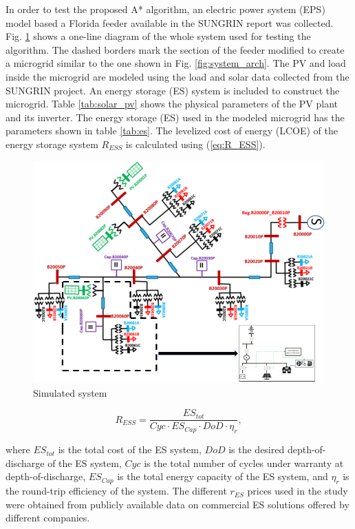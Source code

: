 In order to test the proposed A* algorithm, an electric power system (EPS) model based a Florida feeder available in the SUNGRIN report \cite{SUNGRIN} was collected. Fig. \ref{fig:simulation_grid} shows a one-line diagram of the whole system used for testing the algorithm. The dashed borders mark the section of the feeder modified to create a microgrid similar to the one shown in Fig. \ref{fig:system_arch}. The PV and load inside the microgrid are modeled using the load and solar data collected from the SUNGRIN project. An energy storage (ES) system is included to construct the microgrid. Table \ref{tab:solar_pv} shows the physical parameters of the PV plant and its inverter. The energy storage (ES) used in the modeled microgrid has the parameters shown in table \ref{tab:es}. The levelized cost of energy (LCOE)  of the energy storage system $R_{ESS}$ is calculated using (\ref{eq:R_ESS}).

\begin{figure}[!ht]
    \centering
    \includegraphics[width = \linewidth]{figs/simulation_grid.png}
    \caption{Simulated system}
    \label{fig:simulation_grid}
\end{figure}


\begin{equation}
\label{eq:R_ESS}
R_{ESS} = \dfrac{ES_{tot}}{Cyc\cdot ES_{Cap}\cdot DoD\cdot \eta_{r}},
\end{equation}

where $ES_{tot}$ is the total cost of the ES system, $DoD$ is the desired depth-of-discharge of the ES system, $Cyc$ is the total number of cycles under warranty at depth-of-discharge, $ES_{Cap}$ is the total energy capacity of the ES system, and $\eta_r$ is the round-trip efficiency of the system. The different $r_{ES}$ prices used in the study were obtained from publicly available data on commercial ES solutions offered by different companies. 

